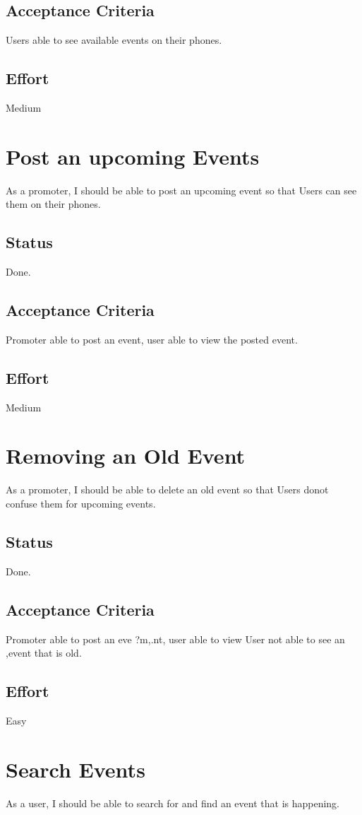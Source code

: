 \documentclass[10pt,a4paper]{article}
\begin{document}
\subsection{Acceptance Criteria}
Users able to see available events on their phones.
\subsection{Effort}
Medium

\section{Post an upcoming Events}
As a promoter, I should be able to post an upcoming event so that Users can see them on their phones.
\subsection{Status}
Done.
\subsection{Acceptance Criteria}
Promoter able to post an event, user able to view the posted event.
\subsection{Effort}
Medium

\section{Removing an Old Event}
As a promoter, I should be able to delete an old event so that Users donot confuse them for upcoming events.
\subsection{Status}
Done.
\subsection{Acceptance Criteria}
Promoter able to post an eve ?m,.nt, user able to view User not able to see an ,event that is old.
\subsection{Effort}
Easy

\section{Search Events}
As a user, I should be able to search for and find an event that is happening.
\end{document}
